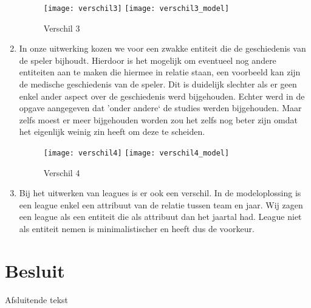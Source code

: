 \documentclass[a4paper,kulak]{kulakarticle}
\begin{document}
\begin{enumerate}
		\begin{figure}[!htb]
			\centering
			\texttt{[image: verschil3]}
			\texttt{[image: verschil3\_model]}
			\caption{Verschil 3}
			\label{fig:verschil3}
		\end{figure}
	\item In onze uitwerking kozen we voor een zwakke entiteit die de geschiedenis van de speler bijhoudt. Hierdoor is het mogelijk om eventueel nog andere entiteiten aan te maken die hiermee in relatie staan, een voorbeeld kan zijn de medische geschiedenis van de speler. Dit is duidelijk slechter als er geen enkel ander aspect over de geschiedenis werd bijgehouden.
	Echter werd in de opgave aangegeven dat 'onder andere` de studies werden bijgehouden. 
	Maar zelfs moest er meer bijgehouden worden zou het zelfs nog beter zijn omdat het eigenlijk weinig zin heeft om deze te scheiden.
	
	
		\begin{figure}[!htb]
			\centering
			\texttt{[image: verschil4]}
			\texttt{[image: verschil4\_model]}
			\caption{Verschil 4}
			\label{fig:verschil4}
		\end{figure}
	\item Bij het uitwerken van leagues is er ook een verschil. In de modeloplossing is een league enkel een attribuut van de relatie tussen team en jaar. Wij zagen een league als een entiteit die als attribuut dan het jaartal had. 
	League niet als entiteit nemen is minimalistischer en heeft dus de voorkeur.

	
	
\end{enumerate}



\section*{Besluit}

Afsluitende tekst
\end{document}

